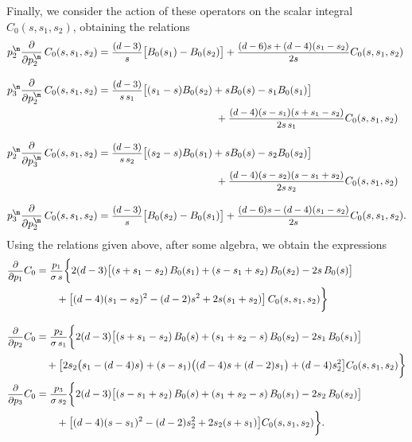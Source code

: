 \documentclass[a4paper,11pt,openright,twoside]{book}
\let\s=\sigma  \let\t=\tau     \let\u=\upsilon \let\f=\phi
\newcommand{\sdfrac}[2]{\mbox{\small$\displaystyle\frac{#1}{#2}$}}
\numberwithin{equation}{section}
\begin{document}
{{Finally, we consider the action of these operators on the scalar integral $C_0(s,s_1,s_2)$, obtaining the relations
\begin{subequations}
	\begin{align}
		p_2^\m\frac{\partial}{\partial p_2^\m}\,C_0(s,s_1,s_2)&=\sdfrac{( d-3)}{s}\big[B_0(s_1)-B_0(s_2)\big]+\sdfrac{( d-6)s+( d-4)(s_1-s_2)}{2s}C_0(s,s_1,s_2)\\[2ex]
		p_3^\m\frac{\partial}{\partial p_2^\m}\,C_0(s,s_1,s_2)&=\sdfrac{( d-3)}{s\,s_1}\big[(s_1-s)B_0(s_2)+sB_0(s)-s_1B_0(s_1)\big]\notag\\
		&\hspace{4cm}+\sdfrac{( d-4)(s-s_1)(s+s_1-s_2)}{2s\,s_1}C_0(s,s_1,s_2)\\[2ex]
		p_2^\m\frac{\partial}{\partial p_3^\m}\,C_0(s,s_1,s_2)&=\sdfrac{( d-3)}{s\,s_2}\big[(s_2-s)B_0(s_1)+sB_0(s)-s_2B_0(s_2)\big]\notag\\
		&\hspace{4cm}+\sdfrac{( d-4)(s-s_2)(s-s_1+s_2)}{2s\,s_2}C_0(s,s_1,s_2)\\[2ex]
		p_3^\m\frac{\partial}{\partial p_2^\m}\,C_0(s,s_1,s_2)&=\sdfrac{( d-3)}{s}\big[B_0(s_2)-B_0(s_1)\big]+\sdfrac{( d-6)s-( d-4)(s_1-s_2)}{2s}C_0(s,s_1,s_2).
	\end{align}
\end{subequations}
Using the relations given above, after some algebra, we obtain the expressions
\begin{subequations}
	\begin{align}
		\sdfrac{\partial}{\partial p_1}C_0&=\sdfrac{p_1}{\s\,s}\bigg\{ 2( d-3)\big[(s+s_1-s_2)\,B_0(s_1)+(s-s_1+s_2)\,B_0(s_2)-2s\,B_0(s)\big]\notag\\
		&\qquad+\big[( d-4)(s_1-s_2)^2-( d-2)s^2+2s(s_1+s_2)\big]\,C_0(s,s_1,s_2)\bigg\}\\[2ex]
		\sdfrac{\partial}{\partial p_2}C_0&=\sdfrac{p_2}{\s\,s_1}\bigg\{ 2( d-3)\big[(s+s_1-s_2)\,B_0(s)+(s_1+s_2-s)\,B_0(s_2)-2s_1\,B_0(s_1)\big]\notag\\
		&\quad+\big[2s_2\big(s_1-( d-4)s\big)+(s-s_1)\big(( d-4)s+( d-2)s_1\big)+( d-4)s_2^2\big]C_0(s,s_1,s_2)\bigg\}\\
		\sdfrac{\partial}{\partial p_3}C_0&=\sdfrac{p_3}{\s\,s_2}\bigg\{ 2( d-3)\big[(s-s_1+s_2)\,B_0(s)+(s_1+s_2-s)\,B_0(s_1)-2s_2\,B_0(s_2)\big]\notag\\
		&\qquad+\big[( d-4)(s-s_1)^2-( d-2)s_2^2+2s_2(s+s_1)\big]C_0(s,s_1,s_2)\bigg\}.
	\end{align}
\end{subequations}

}}
\end{document}
